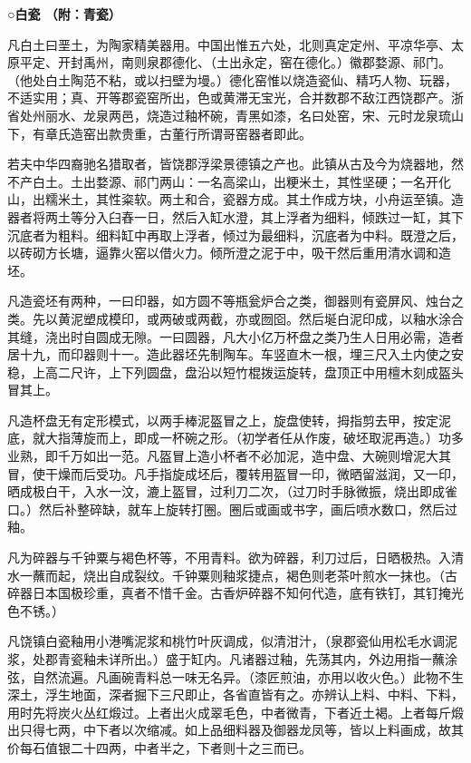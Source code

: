 \documentclass[]{article}
\begin{document}
\textbf{○白瓷 （附：青瓷）}

凡白土曰垩土，为陶家精美器用。中国出惟五六处，北则真定定州、平凉华亭、太原平定、开封禹州，南则泉郡德化、（土出永定，窑在德化。）徽郡婺源、祁门。（他处白土陶范不粘，或以扫壁为墁。）德化窑惟以烧造瓷仙、精巧人物、玩器，不适实用；真、开等郡瓷窑所出，色或黄滞无宝光，合并数郡不敌江西饶郡产。浙省处州丽水、龙泉两邑，烧造过釉杯碗，青黑如漆，名曰处窑，宋、元时龙泉琉山下，有章氏造窑出款贵重，古董行所谓哥窑器者即此。

若夫中华四裔驰名猎取者，皆饶郡浮梁景德镇之产也。此镇从古及今为烧器地，然不产白土。土出婺源、祁门两山：一名高梁山，出粳米土，其性坚硬；一名开化山，出糯米土，其性粢软。两土和合，瓷器方成。其土作成方块，小舟运至镇。造器者将两土等分入臼舂一日，然后入缸水澄，其上浮者为细料，倾跌过一缸，其下沉底者为粗料。细料缸中再取上浮者，倾过为最细料，沉底者为中料。既澄之后，以砖砌方长塘，逼靠火窑以借火力。倾所澄之泥于中，吸干然后重用清水调和造坯。

凡造瓷坯有两种，一曰印器，如方圆不等瓶瓮炉合之类，御器则有瓷屏风、烛台之类。先以黄泥塑成模印，或两破或两截，亦或囫囵。然后埏白泥印成，以釉水涂合其缝，浇出时自圆成无隙。一曰圆器，凡大小亿万杯盘之类乃生人日用必需，造者居十九，而印器则十一。造此器坯先制陶车。车竖直木一根，埋三尺入土内使之安稳，上高二尺许，上下列圆盘，盘沿以短竹棍拨运旋转，盘顶正中用檀木刻成盔头冒其上。

凡造杯盘无有定形模式，以两手棒泥盔冒之上，旋盘使转，拇指剪去甲，按定泥底，就大指薄旋而上，即成一杯碗之形。（初学者任从作废，破坯取泥再造。）功多业熟，即千万如出一范。凡盔冒上造小杯者不必加泥，造中盘、大碗则增泥大其冒，使干燥而后受功。凡手指旋成坯后，覆转用盔冒一印，微晒留滋润，又一印，晒成极白干，入水一汶，漉上盔冒，过利刀二次，（过刀时手脉微振，烧出即成雀口。）然后补整碎缺，就车上旋转打圈。圈后或画或书字，画后喷水数口，然后过釉。

凡为碎器与千钟粟与褐色杯等，不用青料。欲为碎器，利刀过后，日晒极热。入清水一蘸而起，烧出自成裂纹。千钟粟则釉浆捷点，褐色则老茶叶煎水一抹也。（古碎器日本国极珍重，真者不惜千金。古香炉碎器不知何代造，底有铁钉，其钉掩光色不锈。）

凡饶镇白瓷釉用小港嘴泥浆和桃竹叶灰调成，似清泔汁，（泉郡瓷仙用松毛水调泥浆，处郡青瓷釉未详所出。）盛于缸内。凡诸器过釉，先荡其内，外边用指一蘸涂弦，自然流遍。凡画碗青料总一味无名异。（漆匠煎油，亦用以收火色。）此物不生深土，浮生地面，深者掘下三尺即止，各省直皆有之。亦辨认上料、中料、下料，用时先将炭火丛红煅过。上者出火成翠毛色，中者微青，下者近土褐。上者每斤煅出只得七两，中下者以次缩减。如上品细料器及御器龙凤等，皆以上料画成，故其价每石值银二十四两，中者半之，下者则十之三而已。
\end{document}
